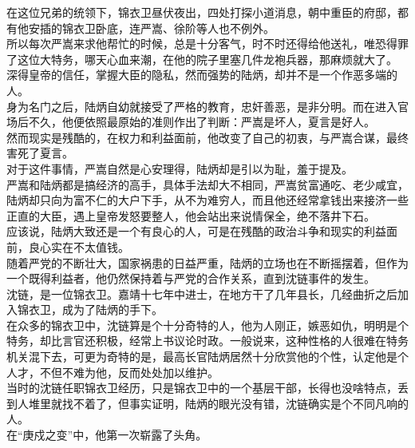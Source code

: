 \begin{multicols}{\theparacolNo}
在这位兄弟的统领下，锦衣卫昼伏夜出，四处打探小道消息，朝中重臣的府邸，都有他安插的锦衣卫卧底，连严嵩、徐阶等人也不例外。\\

所以每次严嵩来求他帮忙的时候，总是十分客气，时不时还得给他送礼，唯恐得罪了这位大特务，哪天心血来潮，在他的院子里塞几件龙袍兵器，那麻烦就大了。\\

深得皇帝的信任，掌握大臣的隐私，然而强势的陆炳，却并不是一个作恶多端的人。\\

身为名门之后，陆炳自幼就接受了严格的教育，忠奸善恶，是非分明。而在进入官场后不久，他便依照最原始的准则作出了判断：严嵩是坏人，夏言是好人。\\

然而现实是残酷的，在权力和利益面前，他改变了自己的初衷，与严嵩合谋，最终害死了夏言。\\

对于这件事情，严嵩自然是心安理得，陆炳却是引以为耻，羞于提及。\\

严嵩和陆炳都是搞经济的高手，具体手法却大不相同，严嵩贫富通吃、老少咸宜，陆炳却只向为富不仁的大户下手，从不为难穷人，而且他还经常拿钱出来接济一些正直的大臣，遇上皇帝发怒要整人，他会站出来说情保全，绝不落井下石。\\

应该说，陆炳大致还是一个有良心的人，可是在残酷的政治斗争和现实的利益面前，良心实在不太值钱。\\

随着严党的不断壮大，国家祸患的日益严重，陆炳的立场也在不断摇摆着，但作为一个既得利益者，他仍然保持着与严党的合作关系，直到沈链事件的发生。\\

沈链，是一位锦衣卫。嘉靖十七年中进士，在地方干了几年县长，几经曲折之后加入锦衣卫，成为了陆炳的手下。\\

在众多的锦衣卫中，沈链算是个十分奇特的人，他为人刚正，嫉恶如仇，明明是个特务，却比言官还积极，经常上书议论时政。一般说来，这种性格的人很难在特务机关混下去，可更为奇特的是，最高长官陆炳居然十分欣赏他的个性，认定他是个人才，不但不难为他，反而处处加以维护。\\

当时的沈链任职锦衣卫经历，只是锦衣卫中的一个基层干部，长得也没啥特点，丢到人堆里就找不着了，但事实证明，陆炳的眼光没有错，沈链确实是个不同凡响的人。\\

在“庚戍之变”中，他第一次崭露了头角。\\


\end{multicols}
